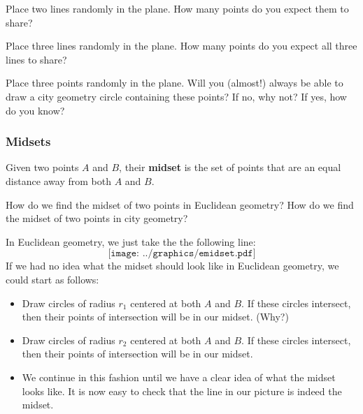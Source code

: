\begin{question} 
Place two lines randomly in the plane. How many points do you expect
them to share?
\end{question}
\QM


\begin{question} 
Place three lines randomly in the plane. How many points do you expect
all three lines to share?
\end{question}
\QM

\begin{question} 
Place three points randomly in the plane. Will you (almost!) always be
able to draw a city geometry circle containing these points? If no,
why not? If yes, how do you know?
\end{question}
\QM



\subsubsection{Midsets}



\begin{definition}
Given two points $A$ and $B$, their \textbf{midset} is the set of points that are an equal distance away from both $A$ and $B$.
\end{definition}
\begin{question}
How do we find the midset of two points in Euclidean geometry? How do we find the midset of two points in city geometry?
\end{question}
In Euclidean geometry, we just take the the following line:
\[
\texttt{[image: ../graphics/emidset.pdf]}
\]
If we had no idea what the midset should look like in Euclidean
geometry, we could start as follows:
\begin{itemize}
\item Draw circles of radius $r_1$ centered at both $A$ and $B$. If these
circles intersect, then their points of intersection will be in our
midset. (Why?)

\item Draw circles of radius $r_2$ centered at both $A$ and $B$. If these
circles intersect, then their points of intersection will be in our
midset.

\item We continue in this fashion until we have a clear idea of what the
midset looks like. It is now easy to check that the line in our
picture is indeed the midset.
\end{itemize}

